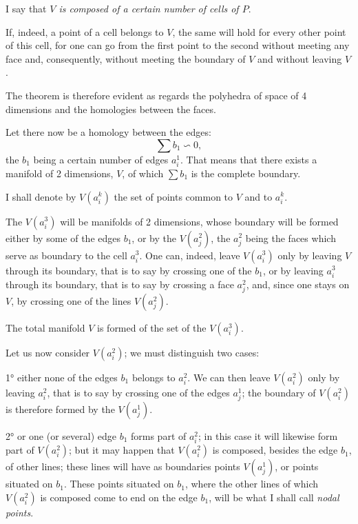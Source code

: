 \documentclass{article}
\begin{document}
I say that \emph{$V$ is composed of a certain number of cells of $P$}.

If, indeed, a point of a cell belongs to $V$, the same will hold for every other point of this cell, for one can go from the first point to the second without meeting any face and, consequently, without meeting the boundary of $V$ and without leaving $V$.

The theorem is therefore evident as regards the polyhedra of space of 4 dimensions and the homologies between the faces.

Let there now be a homology between the edges:
\[ \sum b_{1} \backsim 0, \]
the $b_{1}$ being a certain number of edges $a^{1}_{i}$. That means that there exists a manifold of 2 dimensions, $V$, of which $\displaystyle\sum b_{1}$ is the complete boundary.

I shall denote by $V(a^{k}_{i})$ the set of points common to $V$ and to $a^{k}_{i}$.

The $V(a^{3}_{i})$ will be manifolds of 2 dimensions, whose boundary will be formed either by some of the edges $b_{1}$, or by the $V(a^{2}_{j})$, the $a^{2}_{j}$ being the faces which serve as boundary to the cell $a^{3}_{i}$. One can, indeed, leave $V(a^{3}_{i})$ only by leaving $V$ through its boundary, that is to say by crossing one of the $b_{1}$, or by leaving $a^{3}_{i}$ through its boundary, that is to say by crossing a face $a^{2}_{j}$, and, since one stays on $V$, by crossing one of the lines $V(a^{2}_{j})$.

The total manifold $V$ is formed of the set of the $V(a^{3}_{i})$.

Let us now consider $V(a^{2}_{i})$; we must distinguish two cases:

1° either none of the edges $b_{1}$ belongs to $a^{2}_{i}$. We can then leave $V(a^{2}_{i})$ only by leaving $a^{2}_{i}$, that is to say by crossing one of the edges $a^{1}_{j}$; the boundary of $V(a^{2}_{i})$ is therefore formed by the $V(a^{1}_{j})$.


2° or one (or several) edge $b_{1}$ forms part of $a^{2}_{i}$; in this case it will likewise form part of $V(a^{2}_{i})$; but it may happen that $V(a^{2}_{i})$ is composed, besides the edge $b_{1}$, of other lines; these lines will have as boundaries points $V(a^{1}_{j})$, or points situated on $b_{1}$. These points situated on $b_{1}$, where the other lines of which $V(a^{2}_{i})$ is composed come to end on the edge $b_{1}$, will be what I shall call \emph{nodal points}.
\end{document}
